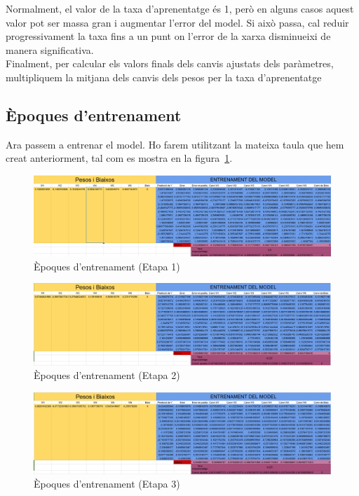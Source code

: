 Normalment, el valor de la taxa d’aprenentatge és 1, però en alguns casos aquest valor pot ser massa gran i augmentar l’error del model. Si això passa, cal reduir progressivament la taxa fins a un punt on l’error de la xarxa disminueixi de manera significativa.\\

Finalment, per calcular els valors finals dels canvis ajustats dels paràmetres, multipliquem la mitjana dels canvis dels pesos per la taxa d’aprenentatge\\
\vspace{-1.8truecm}
\subsection{Èpoques d'entrenament}
Ara passem a entrenar el model. Ho farem utilitzant la mateixa taula que hem creat anteriorment, tal com es mostra en la figura~\ref{f:entrenament}.

\begin{figure}[H]
    \centering
    \includegraphics[width=1\textwidth]{./figures/Etapa1.png}
    \caption{Èpoques d'entrenament (Etapa 1)}
    \label{f:entrenament}
\end{figure}

\begin{figure}[H]
    \centering
    \includegraphics[width=1\textwidth]{./figures/Etapa2.png}
    \caption{Èpoques d'entrenament (Etapa 2)}
\end{figure}

\begin{figure}[H]
    \centering
    \includegraphics[width=1\textwidth]{./figures/Etapa3.png}
    \caption{Èpoques d'entrenament (Etapa 3)}
\end{figure}

